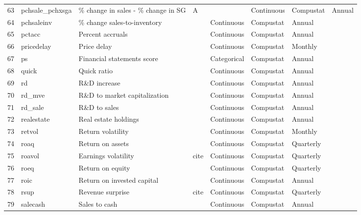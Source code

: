 \documentclass[a4paper, table]{article}
\begin{document}
\begin{landscape}
\begin{table}
\begin{center}
\begin{longtable}{llllllll}
			63 & pchsale\_pchxsga & \% change in sales - \% change in SG&A & 
				\cite{abarbanell_abnormal_1998} & Continuous & Compustat & Annual \\
			64 & pchsaleinv & \% change sales-to-inventory & 
				\cite{ou_financial_1989} & Continuous & Compustat & Annual \\
			65 & pctacc & Percent accruals & 
				\cite{hafzalla_percent_2011} & Continuous & Compustat & Annual \\
			66 & pricedelay & Price delay & 
				\cite{hou_market_2005} & Continuous & Compustat & Monthly \\
			67 & ps & Financial statements score & 
				\cite{piotroski_value_2000} & Categorical & Compustat & Annual \\
			68 & quick & Quick ratio & 
				\cite{ou_financial_1989} & Continuous & Compustat & Annual \\
			69 & rd & R\&D increase & 
				\cite{eberhart_examination_2004} & Continuous & Compustat & Annual \\ \hline
			70 & rd\_mve & R\&D to market capitalization & 
				\cite{guo_explaining_2006} & Continuous & Compustat & Annual \\
			71 & rd\_sale & R\&D to sales & 
				\cite{guo_explaining_2006} & Continuous & Compustat & Annual \\
			72 & realestate & Real estate holdings & 
				\cite{tuzel_corporate_2010} & Continuous & Compustat & Annual \\
			73 & retvol & Return volatility & 
				\cite{ang_cross-section_2006} & Continuous & Compustat & Monthly \\
			74 & roaq & Return on assets & 
				\cite{balakrishnan_post_2010} & Continuous & Compustat & Quarterly \\
			75 & roavol & Earnings volatility & 
				cite & Continuous & Compustat & Quarterly \\
			76 & roeq & Return on equity & 
				\cite{hou_digesting_2015} & Continuous & Compustat & Quarterly \\
			77 & roic & Return on invested capital & 
				\cite{brown_productivity_2007} & Continuous & Compustat & Annual \\
			78 & rsup & Revenue surprise & 
				cite & Continuous & Compustat & Quarterly \\
			79 & salecash & Sales to cash & 
				\cite{ou_financial_1989} & Continuous & Compustat & Annual \\ \hline

\end{longtable}
\end{center}
\end{table}
\end{landscape}
\end{document}
